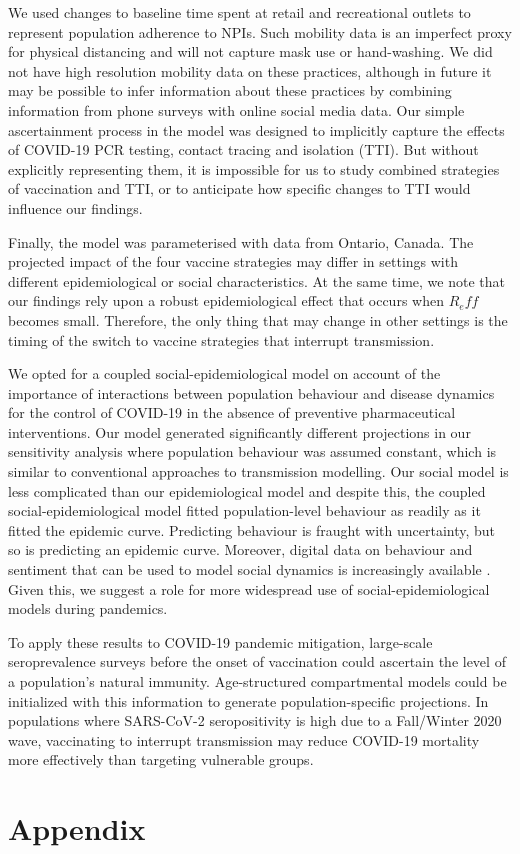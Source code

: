 We used changes to baseline time spent at retail and recreational outlets to represent population adherence to NPIs.  Such mobility data is an imperfect proxy for physical distancing and will not capture mask use or hand-washing.  We did not have high resolution mobility data on these practices, although in future it may be possible to infer information about these practices by combining information from phone surveys with online social media data. Our simple ascertainment process in the model was designed to implicitly capture the effects of COVID-19 PCR testing, contact tracing and isolation (TTI). But without explicitly representing them, it is impossible for us to study combined strategies of vaccination and TTI, or to anticipate how specific changes to TTI would influence our findings. 

Finally, the model was parameterised with data from Ontario, Canada. The projected impact of the four vaccine strategies may differ in settings with different epidemiological or social characteristics.  At the same time, we note that our findings rely upon a robust epidemiological effect that occurs when $R_eff$ becomes small. Therefore, the only thing that may change in other settings is the timing of the switch to vaccine strategies that interrupt transmission. 

We opted for a coupled social-epidemiological model on account of the importance of interactions between population behaviour and disease dynamics for the control of COVID-19 in the absence of preventive pharmaceutical interventions. Our model generated significantly different projections in our sensitivity analysis where population behaviour was assumed constant, which is similar to conventional approaches to transmission modelling. Our social model is less complicated than our epidemiological model and despite this, the coupled social-epidemiological model fitted population-level behaviour as readily as it fitted the epidemic curve. Predicting behaviour is fraught with uncertainty, but so is predicting an epidemic curve. Moreover, digital data on behaviour and sentiment that can be used to model social dynamics is increasingly available \cite{salathe2012digital}.  Given this, we suggest a role for more widespread use of  social-epidemiological models during pandemics. 

To apply these results to COVID-19 pandemic mitigation, large-scale seroprevalence surveys before the onset of vaccination could ascertain the level of a population's natural immunity.  Age-structured compartmental models could be initialized with this information to generate population-specific projections. In populations where SARS-CoV-2 seropositivity is high due to a Fall/Winter 2020 wave, vaccinating to interrupt transmission may reduce COVID-19 mortality more effectively than targeting vulnerable groups. 


\section{Appendix}

